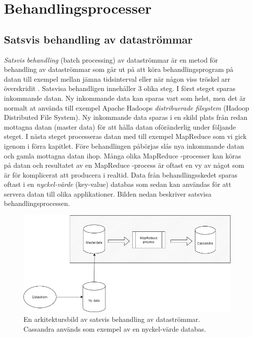 \chapter{Behandlingsprocesser}

\section{Satsvis behandling av dataströmmar}

\textit{Satsvis behandling} (batch processing) av dataströmmar är en metod för behandling av 
dataströmmar som går ut på att köra behandlingsprogram på datan till exempel mellan jämna
tidsinterval eller när någon viss tröskel arr överskridit \citep{marz2013big}. Satsvisa behandligen
innehåller 3 olika steg. I först steget sparas inkommande datan. Ny inkommande data kan sparas vart
som helst, men det är normalt at använda till exempel Apache Hadoops \textit{distribuerade 
filsystem} (Hadoop Distributed File System). Ny inkommande data sparas i en skild plats från redan
mottagna datan (master data) för att hålla datan oföränderlig under följande steget. I nästa steget processeras datan med till exempel
MapReduce som vi gick igenom i förra kapitlet. Före behandlingen påbörjas slås nya inkommande datan och gamla mottagna datan ihop.
Många olika MapReduce -processer kan köras på datan och resultatet av en MapReduce -process är oftast en vy av något som är
för komplicerat att producera i realtid. Data från behandlingsskedet sparas oftast i en \textit{nyckel-värde} (key-value) databas som sedan kan användas
för att servera datan till olika applikationer. Bilden nedan beskriver satsvisa behandlingsprocessen.

\begin{figure}[h]
    \centering
    \includegraphics[scale=0.6]{img/batch-pipeline.png}
    \caption{En arkitektursbild av satsvis behandling av dataströmmar. Cassandra används som exempel av en nyckel-värde databas.}
    \label{fig:mesh1}
\end{figure}


